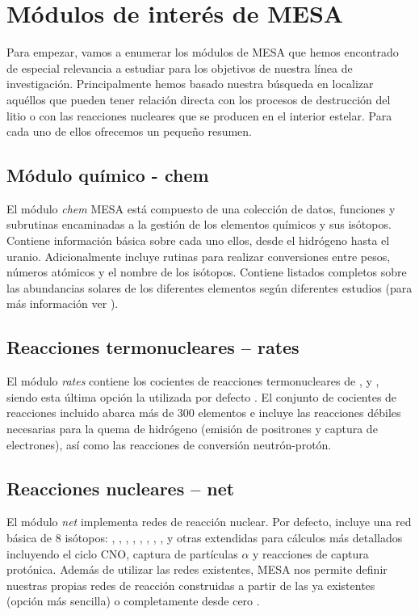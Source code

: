 \section{Módulos de interés de MESA}
Para empezar, vamos a enumerar los módulos de MESA que hemos encontrado de especial relevancia a estudiar para los objetivos de nuestra línea de investigación. Principalmente hemos basado nuestra búsqueda en localizar aquéllos que pueden tener relación directa con los procesos de destrucción del litio o con las reacciones nucleares que se producen en el interior estelar. Para cada uno de ellos ofrecemos un pequeño resumen.

\subsection{Módulo químico - chem}
El módulo \textit{chem} MESA está compuesto de una colección de datos, funciones y subrutinas encaminadas a la gestión de los elementos químicos y sus isótopos. Contiene información básica sobre cada uno ellos, desde el hidrógeno hasta el uranio. Adicionalmente incluye rutinas para realizar conversiones entre pesos, números atómicos y el nombre de los isótopos. Contiene listados completos sobre las abundancias solares de los diferentes elementos según diferentes estudios (para más información ver \cite{Paxton2011}).\par

\subsection{Reacciones termonucleares – rates}
El módulo \textit{rates} contiene los cocientes de reacciones termonucleares de \cite{Caughlan1988}, y \cite{Angulo1999}, siendo esta última opción la utilizada por defecto \citep{Paxton2011}. El conjunto de cocientes de reacciones incluido abarca más de 300 elementos e incluye las reacciones débiles necesarias para la quema de hidrógeno (emisión de positrones y captura de electrones), así como las reacciones de conversión neutrón-protón.

\subsection{Reacciones nucleares – net} \label{reac_nuc}
El módulo \textit{net} implementa redes de reacción nuclear. Por defecto, incluye una red básica de 8 isótopos: , , , , , , , , y otras extendidas para cálculos más detallados incluyendo el ciclo CNO, captura de partículas $\alpha$ y reacciones de captura protónica. Además de utilizar las redes existentes, MESA nos permite definir nuestras propias redes de reacción construidas a partir de las ya existentes (opción más sencilla) o completamente desde cero \citep{Paxton2011}.\par

